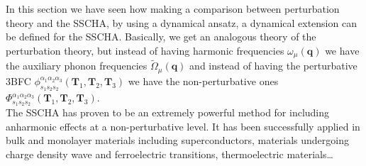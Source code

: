 In this section we have seen how making a comparison between perturbation theory and the SSCHA, by using a dynamical ansatz, a dynamical extension can be defined for the SSCHA. Basically, we get an analogous theory 
of the perturbation theory, but instead of having harmonic frequencies $\omega_{\mu}(\mathbf{q})$ we have the auxiliary phonon frequencies $\tilde{\Omega}_{\mu}(\mathbf{q})$ and instead of having the perturbative 
3BFC $\phi_{s_{1}s_{2}s_{2}}^{\alpha_{1}\alpha_{2}\alpha_{3}}(\mathbf{T}_{1},\mathbf{T}_{2},\mathbf{T}_{3})$ we have the non-perturbative ones $\Phi_{s_{1}s_{2}s_{2}}^{\alpha_{1}\alpha_{2}\alpha_{3}}(\mathbf{
T}_{1},\mathbf{T}_{2},\mathbf{T}_{3})$.  \\

The SSCHA has proven to be an extremely powerful method for including anharmonic effects at a non-perturbative level. It has been successfully applied in bulk and monolayer materials including 
superconductors\cite{errea2013first,errea2016quantum}, materials undergoing charge density wave\cite{leroux2015strong,bianco2019quantum} and ferroelectric\cite{ribeiro2018strong} transitions, thermoelectric 
materials\cite{aseginolaza2019phonon}\dots
